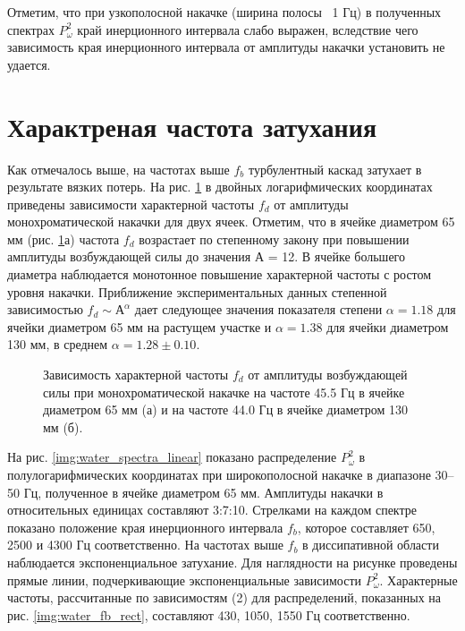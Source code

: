 Отметим, что при узкополосной накачке (ширина полосы ~1 Гц) в полученных спектрах $P^2_\omega$ край инерционного интервала слабо выражен, вследствие чего зависимость края инерционного интервала от амплитуды накачки установить не удается.

\section{Характреная частота затухания}%
Как отмечалось выше, на частотах выше $f_b$ турбулентный каскад затухает в результате вязких потерь. На рис. \ref{img:water_fd_mono} в двойных логарифмических координатах приведены зависимости характерной частоты $f_d$ от амплитуды монохроматической накачки для двух ячеек. Отметим, что в ячейке диаметром 65 мм (рис. \ref{img:water_fd_mono}а) частота $f_d$ возрастает по степенному закону при повышении амплитуды возбуждающей силы до значения А = 12. В ячейке большего диаметра наблюдается монотонное повышение характерной частоты с ростом уровня накачки. Приближение экспериментальных данных степенной зависимостью $f_d \sim А^\alpha$ дает следующее значения показателя степени $\alpha = 1.18$ для ячейки диаметром 65 мм на растущем участке и $\alpha = 1.38$ для ячейки диаметром 130 мм, в среднем $\alpha = 1.28 \pm 0.10$.

\begin{figure}[ht]
  \begin{minipage}[ht]{0.49\linewidth}
  \end{minipage}
  \hfill
  \begin{minipage}[ht]{0.49\linewidth}
  \end{minipage}
  \caption{Зависимость характерной частоты $f_d$ от амплитуды возбуждающей силы при монохроматической накачке на частоте 45.5 Гц в ячейке диаметром 65 мм (а) и на частоте 44.0 Гц в ячейке диаметром 130 мм (б).}
  \label{img:water_fd_mono}  
\end{figure}

На рис. \ref{img:water_spectra_linear} показано распределение $P^2_\omega$ в полулогарифмических координатах при широкополосной накачке в диапазоне 30–50 Гц, полученное в ячейке диаметром 65 мм. Амплитуды накачки в относительных единицах составляют 3:7:10. Стрелками на каждом спектре показано положение края инерционного интервала $f_b$, которое составляет 650, 2500 и 4300 Гц соответственно. На частотах выше $f_b$ в диссипативной области наблюдается экспоненциальное затухание. Для наглядности на рисунке проведены прямые линии, подчеркивающие экспоненциальные зависимости $P^2_\omega$. Характерные частоты, рассчитанные по зависимостям (2) для распределений, показанных на рис. \ref{img:water_fb_rect}, составляют 430, 1050, 1550 Гц соответственно.

